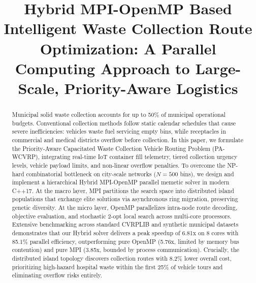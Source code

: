 \documentclass[conference]{IEEEtran}
\begin{document}
\title{Hybrid MPI-OpenMP Based Intelligent Waste Collection Route Optimization: A Parallel Computing Approach to Large-Scale, Priority-Aware Logistics}

\author{
\and
{}
}

\maketitle

\begin{abstract}
Municipal solid waste collection accounts for up to 50\% of municipal operational budgets. Conventional collection methods follow static calendar schedules that cause severe inefficiencies: vehicles waste fuel servicing empty bins, while receptacles in commercial and medical districts overflow before collection. In this paper, we formulate the Priority-Aware Capacitated Waste Collection Vehicle Routing Problem (PA-WCVRP), integrating real-time IoT container fill telemetry, tiered collection urgency levels, vehicle payload limits, and non-linear overflow penalties. To overcome the NP-hard combinatorial bottleneck on city-scale networks ($N=500$ bins), we design and implement a hierarchical Hybrid MPI-OpenMP parallel memetic solver in modern C++17. At the macro layer, MPI partitions the search space into distributed island populations that exchange elite solutions via asynchronous ring migration, preserving genetic diversity. At the micro layer, OpenMP parallelizes intra-node route decoding, objective evaluation, and stochastic 2-opt local search across multi-core processors. Extensive benchmarking across standard CVRPLIB and synthetic municipal datasets demonstrates that our Hybrid solver delivers a peak speedup of 6.81x on 8 cores with 85.1\% parallel efficiency, outperforming pure OpenMP (5.76x, limited by memory bus contention) and pure MPI (3.85x, bounded by process communication). Crucially, the distributed island topology discovers collection routes with 8.2\% lower overall cost, prioritizing high-hazard hospital waste within the first 25\% of vehicle tours and eliminating overflow risks entirely.
\end{abstract}
\end{document}
